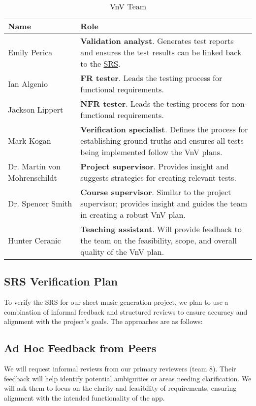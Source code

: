 \documentclass[12pt, titlepage]{article}
\begin{document}
\begin{table}[h!]
  \centering
  \caption{VnV Team}
  \vspace{5pt}
  \begin{tabular}{|p{}|p{}|}
  \hline
    \textbf{Name} & \textbf{Role} \\
  \hline
    Emily Perica & \textbf{Validation analyst}. Generates test reports and ensures the test results can be 
    linked back to the \href{https://github.com/emilyperica/ScoreGen/blob/main/docs/SRS-Volere/SRS.pdf}{SRS}.\\
  \hline
    Ian Algenio & \textbf{FR tester}. Leads the testing process for functional requirements. \\
  \hline
    Jackson Lippert & \textbf{NFR tester}. Leads the testing process for non-functional requirements. \\
  \hline
    Mark Kogan & \textbf{Verification specialist}. Defines the process for establishing ground truths and 
    ensures all tests being implemented follow the VnV plans. \\
  \hline
    Dr. Martin von \newline Mohrenschildt & \textbf{Project supervisor}. Provides insight and suggests 
    strategies for creating relevant tests. \\
  \hline
    Dr. Spencer Smith & \textbf{Course supervisor}. Similar to the project supervisor; provides insight and 
    guides the team in creating a robust VnV plan.\\
  \hline
    Hunter Ceranic & \textbf{Teaching assistant}. Will provide feedback to the team on the feasibility, scope, 
    and overall quality of the VnV plan.\\
  \hline
  \end{tabular}
\end{table}

\subsection{SRS Verification Plan}
\label{sec:srs_verification}

To verify the SRS for our sheet music generation project, we plan to use a combination of informal feedback and structured reviews to ensure accuracy and alignment with the project's goals. The approaches are as follows:

\subsection*{Ad Hoc Feedback from Peers}
We will request informal reviews from our primary reviewers (team 8). Their feedback will help identify potential ambiguities or areas needing clarification. We will ask them to focus on the clarity and feasibility of requirements, ensuring alignment with the intended functionality of the app.
\end{document}
